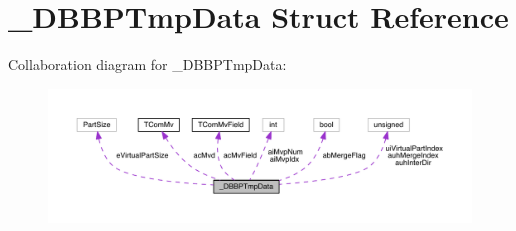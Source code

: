 \hypertarget{struct___d_b_b_p_tmp_data}{}\section{\+\_\+\+D\+B\+B\+P\+Tmp\+Data Struct Reference}
\label{struct___d_b_b_p_tmp_data}


Collaboration diagram for \+\_\+\+D\+B\+B\+P\+Tmp\+Data\+:
\nopagebreak
\begin{figure}[H]
\begin{center}
\leavevmode
\includegraphics[width=350pt]{db/d48/struct___d_b_b_p_tmp_data__coll__graph}
\end{center}
\end{figure}
